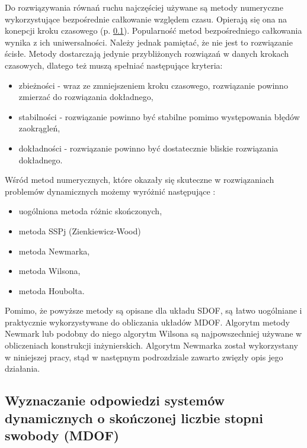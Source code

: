 Do rozwiązywania równań ruchu najczęściej używane są metody numeryczne wykorzystujące bezpośrednie całkowanie względem czasu. Opierają się ona na konepcji kroku czasowego  (p. \ref{section: mdof_response}). Popularność metod bezpośredniego całkowania wynika z ich uniwersalności. Należy jednak pamiętać, że nie jest to rozwiązanie ścisłe. Metody dostarczają jedynie przybliżonych rozwiązań w danych krokach czasowych, dlatego też muszą spełniać następujące kryteria:
\begin{itemize}[noitemsep]
	\item zbieżności  - wraz ze zmniejszeniem kroku czasowego, rozwiązanie powinno zmierzać do rozwiązania dokładnego,
	\item stabilności  - rozwiązanie powinno być stabilne pomimo występowania błędów zaokrągleń,
	\item dokładności  - rozwiązanie powinno być dostatecznie bliskie rozwiązania dokładnego.
\end{itemize}
Wśród metod numerycznych, które okazały się skuteczne w rozwiązaniach problemów dynamicznych możemy wyróżnić następujące \parencite{Rakowski2016}:
\begin{itemize}[noitemsep]
\item uogólniona metoda różnic skończonych,
\item metoda SSPj (Zienkiewicz-Wood)
\item metoda Newmarka,
\item metoda Wilsona, 
\item metoda Houbolta.
 
\end{itemize}
Pomimo, że powyższe metody są opisane dla układu SDOF, są łatwo uogólniane i praktycznie wykorzystywane do obliczania układów MDOF. Algorytm metody Newmark lub podobny do niego algorytm Wilsona są najpowszechniej używane w obliczeniach konstrukcji inżynierskich. Algorytm Newmarka został wykorzystany w niniejszej pracy, stąd w następnym podrozdziale zawarto zwięzły opis jego działania.


\subsection{Wyznaczanie odpowiedzi systemów dynamicznych o skończonej liczbie stopni swobody (MDOF)} \label{section: mdof_response}

